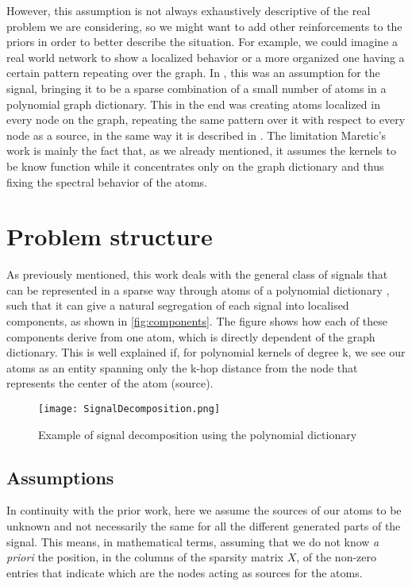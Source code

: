 However, this assumption is not always exhaustively descriptive of the real problem we are considering, so we might want to add other reinforcements to the priors in order to better describe the situation. For example, we could imagine a real world network to show a localized behavior or a more organized one having a certain pattern repeating over the graph. In \cite{Maretic2017}, this was an assumption for the signal, bringing it to be a sparse combination of a small number of atoms in a polynomial graph dictionary. This in the end was creating atoms localized in every node on the graph, repeating the same pattern over it with respect to every node as a source, in the same way it is described in \cite{Thanou2014}. The limitation Maretic's work is mainly the fact that, as we already mentioned, it assumes the kernels to be know function while it concentrates only on the graph dictionary and thus fixing the spectral behavior of the atoms.

\section{Problem structure}
As previously mentioned, this work deals with the general class of signals that can be represented in a sparse way through atoms of a polynomial dictionary \cite{Thanou2014}, such that it can give a natural segregation of each signal into localised components, as shown in \autoref{fig:components}. The figure shows how each of these components derive from one atom, which is directly dependent of the graph dictionary. This is well explained if, for polynomial kernels of degree k, we see our atoms as an entity spanning only the k-hop distance from the node that represents the center of the atom (source).

\begin{figure}
\centering
\texttt{[image: SignalDecomposition.png]}
\caption{Example of signal decomposition using the polynomial dictionary}
\label{fig:components}
\end{figure}

\subsection{Assumptions}
In continuity with the prior work, here we assume the sources of our atoms to be unknown and not necessarily the same for all the different generated parts of the signal. This means, in mathematical terms, assuming that we do not know \textit{a priori} the position, in the columns of the sparsity matrix $X$, of the non-zero entries that indicate which are the nodes acting as sources for the atoms.

